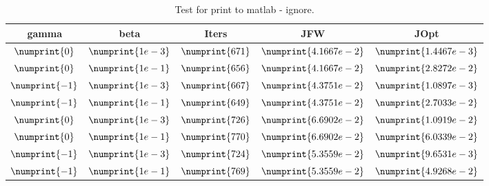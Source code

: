 \documentclass[11pt, a4paper]{article}
\theoremstyle{definition}
\begin{document}
\begin{table}
	\begin{tabular}{ ||c|| c | c |c | c ||}
		\hline
		gamma & beta & Iters  & JFW & JOpt \\
		\hline
		$\numprint{0}$ & $\numprint{1e-3}$ & $\numprint{671}$ & $\numprint{4.1667e-2}$ & $\numprint{1.4467e-3}$ \\
		$\numprint{0}$ & $\numprint{1e-1}$ & $\numprint{656}$ & $\numprint{4.1667e-2}$ & $\numprint{2.8272e-2}$ \\
		$\numprint{-1}$ & $\numprint{1e-3}$ & $\numprint{667}$ & $\numprint{4.3751e-2}$ & $\numprint{1.0897e-3}$ \\
		$\numprint{-1}$ & $\numprint{1e-1}$ & $\numprint{649}$ & $\numprint{4.3751e-2}$ & $\numprint{2.7033e-2}$ \\
		$\numprint{0}$ & $\numprint{1e-3}$ & $\numprint{726}$ & $\numprint{6.6902e-2}$ & $\numprint{1.0919e-2}$ \\
		$\numprint{0}$ & $\numprint{1e-1}$ & $\numprint{770}$ & $\numprint{6.6902e-2}$ & $\numprint{6.0339e-2}$ \\
		$\numprint{-1}$ & $\numprint{1e-3}$ & $\numprint{724}$ & $\numprint{5.3559e-2}$ & $\numprint{9.6531e-3}$ \\
		$\numprint{-1}$ & $\numprint{1e-1}$ & $\numprint{769}$ & $\numprint{5.3559e-2}$ & $\numprint{4.9268e-2}$ \\
		\hline
	\end{tabular}
\caption{Test for print to matlab - ignore.}
\label{Tabv}
\end{table}
\end{document}
